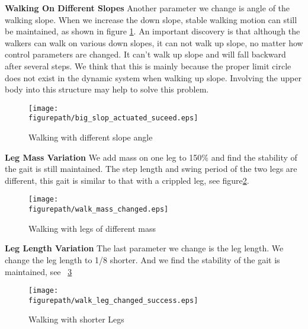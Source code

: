\textbf{Walking On Different Slopes}
Another parameter we change is angle of the walking slope. 
When we increase the down slope, stable walking motion can still be maintained, as shown in figure \ref{fig:diff_slop}.
An important discovery is that although the walkers can walk on various down slopes, it can not walk up slope, no matter how control parameters are changed.
It can't walk up slope and will fall backward after several steps. 
We think that this is mainly because the proper limit circle does not exist in the dynamic system when walking up slope. Involving the upper body into this structure may help to solve this problem.

\begin{figure}[h]
\centering
\texttt{[image: \\figurepath/big\_slop\_actuated\_suceed.eps]}
\caption
{
Walking with different slope angle
}
\label{fig:diff_slop}
\end{figure}

\textbf{Leg Mass Variation}
We add mass on one leg to 150\% and find the stability of the gait is still maintained. 
The step length and swing period of the two legs are different, this gait is similar to that with a crippled leg, see figure\ref{fig:leg mass}.

\begin{figure}[H]
\centering
\texttt{[image: \\figurepath/walk\_mass\_changed.eps]}
\label{fig:walk_mass_changed}
\caption
{
Walking with legs of different mass
}
\label{fig:leg mass}
\end{figure}

\textbf{Leg Length Variation}
The last parameter we change is the leg length. 
We change the leg length to 1/8 shorter. 
And we find the stability of the gait is maintained, see \figurename ~\ref{fig:walk_leg_changed}

\begin{figure}[H]
\centering
\texttt{[image: \\figurepath/walk\_leg\_changed\_success.eps]}
\caption
{
Walking with shorter Legs
}
\label{fig:walk_leg_changed}
\end{figure}

